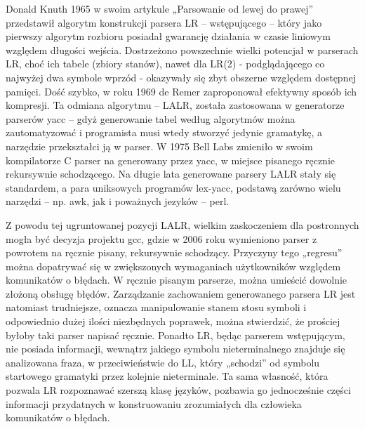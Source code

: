 Donald Knuth 1965 w swoim artykule „Parsowanie od lewej do prawej”\cite{TRANSLATION_FROM_LEFT_TO_RIGHT} przedstawił algorytm konstrukcji parsera LR – wstępującego – który jako pierwszy algorytm rozbioru posiadał gwarancję działania w czasie liniowym względem długości wejścia. Dostrzeżono powszechnie wielki potencjał w parserach LR,  choć ich tabele (zbiory stanów), nawet dla LR(2) - podglądającego co najwyżej dwa symbole wprzód - okazywały się zbyt obszerne względem dostępnej pamięci. Dość szybko, w roku 1969 de Remer zaproponował efektywny sposób ich kompresji\cite{LALR}. Ta odmiana algorytmu – LALR, została zastosowana w generatorze parserów yacc – gdyż generowanie tabel według algorytmów można zautomatyzować i programista musi wtedy stworzyć jedynie gramatykę, a narzędzie przekształci ją w parser. W 1975 Bell Labs zmieniło w swoim kompilatorze C parser na generowany przez yacc, w miejsce pisanego ręcznie rekursywnie schodzącego. Na długie lata generowane parsery LALR stały się standardem, a para uniksowych programów lex-yacc, podstawą zarówno wielu narzędzi – np. awk, jak i poważnych jezyków – perl.\cite{parsing_timeline_kegler}

Z powodu tej ugruntowanej pozycji LALR, wielkim zaskoczeniem dla postronnych mogła być decyzja projektu gcc, gdzie w 2006 roku wymieniono parser z powrotem na ręcznie pisany, rekursywnie schodzący.\cite{gcc_2006_release_note} Przyczyny tego „regresu” można dopatrywać się w zwiększonych wymaganiach użytkowników względem komunikatów o błędach. W ręcznie pisanym parserze, można umieścić dowolnie złożoną obsługę błędów. Zarządzanie zachowaniem generowanego parsera LR jest natomiast trudniejsze, oznacza manipulowanie stanem stosu symboli i odpowiednio dużej ilości niezbędnych poprawek, można stwierdzić, że prościej byłoby taki parser napisać ręcznie. Ponadto LR, będąc parserem wstępującym, nie posiada informacji, wewnątrz jakiego symbolu nieterminalnego znajduje się analizowana fraza, w przeciwieństwie do LL, który „schodzi” od symbolu startowego gramatyki przez kolejnie nieterminale. Ta sama własność, która pozwala LR rozpoznawać szerszą klasę języków, pozbawia go jednocześnie części informacji przydatnych w konstruowaniu zrozumiałych dla człowieka komunikatów o błędach.\cite{parsing_timeline_kegler}%

